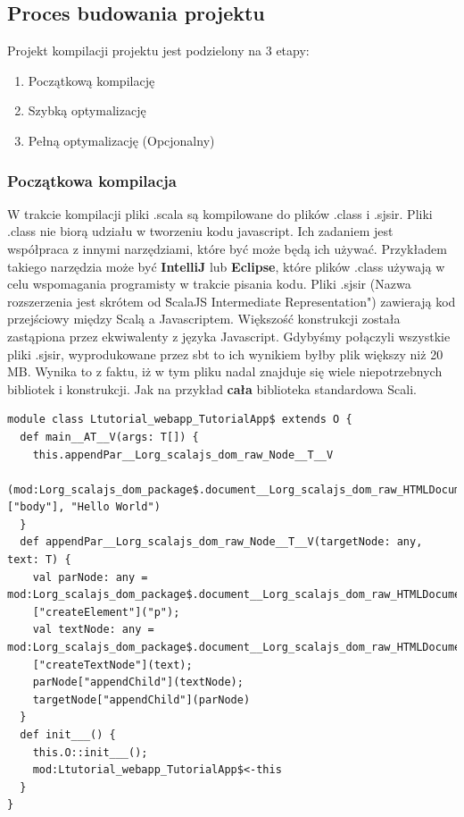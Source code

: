 
\subsection{Proces budowania projektu}

Projekt kompilacji projektu jest podzielony na 3 etapy\cite{HandsOnScalaPipeline}:
\begin{enumerate}
	\item Początkową kompilację
	\item Szybką optymalizację
	\item Pełną optymalizację (Opcjonalny)
\end{enumerate}

\subsubsection{Początkowa kompilacja}

W trakcie kompilacji pliki .scala są kompilowane do plików .class i .sjsir. 
Pliki .class nie biorą udziału w tworzeniu kodu javascript. Ich zadaniem jest współpraca z innymi narzędziami, które być może będą ich używać. Przykładem takiego narzędzia może być \textbf{IntelliJ} lub \textbf{Eclipse}, które plików .class używają w celu wspomagania programisty w trakcie pisania kodu.
Pliki .sjsir (Nazwa rozszerzenia jest skrótem od \"ScalaJS Intermediate Representation")\cite{ScalaCompilationProcess} zawierają kod przejściowy między Scalą a Javascriptem. Większość konstrukcji została zastąpiona przez ekwiwalenty z języka Javascript. 
Gdybyśmy połączyli wszystkie pliki .sjsir, wyprodukowane przez sbt to ich wynikiem byłby plik większy niż 20 MB. Wynika to z faktu, iż w tym pliku nadal znajduje się wiele niepotrzebnych bibliotek i konstrukcji. Jak na przykład \textbf{cała} biblioteka standardowa Scali.


\begin{lstlisting}[label={lst:scalasbt},
frame=single, numbers=none,captionpos=b, 
caption={Przykładowy plik .sjsir dla projektu wyświetlającego HelloWorld na ekranie.}]
module class Ltutorial_webapp_TutorialApp$ extends O {
  def main__AT__V(args: T[]) {
    this.appendPar__Lorg_scalajs_dom_raw_Node__T__V
    (mod:Lorg_scalajs_dom_package$.document__Lorg_scalajs_dom_raw_HTMLDocument()["body"], "Hello World")
  }
  def appendPar__Lorg_scalajs_dom_raw_Node__T__V(targetNode: any, text: T) {
    val parNode: any = mod:Lorg_scalajs_dom_package$.document__Lorg_scalajs_dom_raw_HTMLDocument()
    ["createElement"]("p");
    val textNode: any = mod:Lorg_scalajs_dom_package$.document__Lorg_scalajs_dom_raw_HTMLDocument()
    ["createTextNode"](text);
    parNode["appendChild"](textNode);
    targetNode["appendChild"](parNode)
  }
  def init___() {
    this.O::init___();
    mod:Ltutorial_webapp_TutorialApp$<-this
  }
}
\end{lstlisting}

